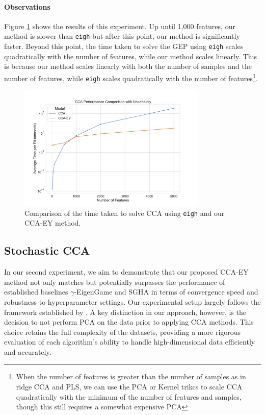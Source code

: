 \paragraph{Observations}
Figure \ref{fig:cca-comparison} shows the results of this experiment.
Up until 1,000 features, our method is slower than \texttt{eigh} but after this point, our method is significantly faster.
Beyond this point, the time taken to solve the GEP using \texttt{eigh} scales quadratically with the number of features, while our method scales linearly.
This is because our method scales linearly with both the number of samples and the number of features, while \texttt{eigh} scales quadratically with the number of features\footnote{When the number of features is greater than the number of samples as in ridge CCA and PLS, we can use the PCA or Kernel trikcs to scale CCA quadratically with the minimum of the number of features and samples, though this still requires a somewhat expensive PCA}.

\begin{figure}
    \centering
    \includegraphics[width=0.8\textwidth]{figures/benchmarks/cca_comparison_log}
    \caption{Comparison of the time taken to solve CCA using \texttt{eigh} and our CCA-EY method.}
    \label{fig:cca-comparison}
\end{figure}

\subsection{Stochastic CCA}
In our second experiment, we aim to demonstrate that our proposed CCA-EY method not only matches but potentially surpasses the performance of established baselines $\gamma$-EigenGame and SGHA in terms of convergence speed and robustness to hyperparameter settings.
Our experimental setup largely follows the framework established by \citet{meng2021online, gemp2022generalized}.
A key distinction in our approach, however, is the decision to not perform PCA on the data prior to applying CCA methods.
This choice retains the full complexity of the datasets, providing a more rigorous evaluation of each algorithm's ability to handle high-dimensional data efficiently and accurately.

